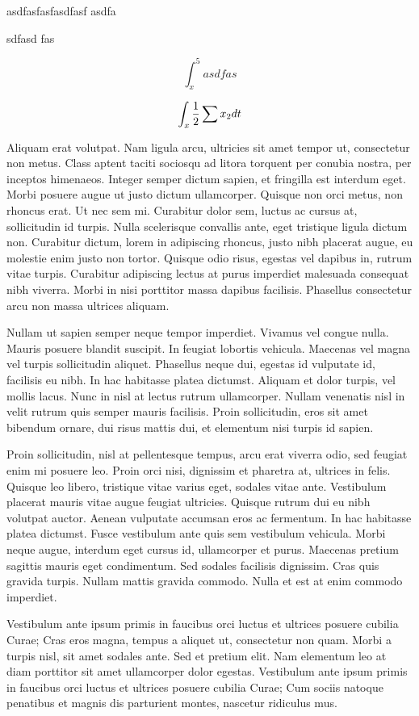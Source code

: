 asdfasfasfasdfasf asdfa

sdfasd fas

\[
\int_{x}^{5}asdfas
\]

\[
\int_{x}\frac{1}{2}\sum x_{2}dt
\]

Aliquam erat volutpat. Nam ligula arcu, ultricies sit amet tempor
ut, consectetur non metus. Class aptent taciti sociosqu ad litora
torquent per conubia nostra, per inceptos himenaeos. Integer semper
dictum sapien, et fringilla est interdum eget. Morbi posuere augue
ut justo dictum ullamcorper. Quisque non orci metus, non rhoncus erat.
Ut nec sem mi. Curabitur dolor sem, luctus ac cursus at, sollicitudin
id turpis. Nulla scelerisque convallis ante, eget tristique ligula
dictum non. Curabitur dictum, lorem in adipiscing rhoncus, justo nibh
placerat augue, eu molestie enim justo non tortor. Quisque odio risus,
egestas vel dapibus in, rutrum vitae turpis. Curabitur adipiscing
lectus at purus imperdiet malesuada consequat nibh viverra. Morbi
in nisi porttitor massa dapibus facilisis. Phasellus consectetur arcu
non massa ultrices aliquam.

Nullam ut sapien semper neque tempor imperdiet. Vivamus vel congue
nulla. Mauris posuere blandit suscipit. In feugiat lobortis vehicula.
Maecenas vel magna vel turpis sollicitudin aliquet. Phasellus neque
dui, egestas id vulputate id, facilisis eu nibh. In hac habitasse
platea dictumst. Aliquam et dolor turpis, vel mollis lacus. Nunc in
nisl at lectus rutrum ullamcorper. Nullam venenatis nisl in velit
rutrum quis semper mauris facilisis. Proin sollicitudin, eros sit
amet bibendum ornare, dui risus mattis dui, et elementum nisi turpis
id sapien.

Proin sollicitudin, nisl at pellentesque tempus, arcu erat viverra
odio, sed feugiat enim mi posuere leo. Proin orci nisi, dignissim
et pharetra at, ultrices in felis. Quisque leo libero, tristique vitae
varius eget, sodales vitae ante. Vestibulum placerat mauris vitae
augue feugiat ultricies. Quisque rutrum dui eu nibh volutpat auctor.
Aenean vulputate accumsan eros ac fermentum. In hac habitasse platea
dictumst. Fusce vestibulum ante quis sem vestibulum vehicula. Morbi
neque augue, interdum eget cursus id, ullamcorper et purus. Maecenas
pretium sagittis mauris eget condimentum. Sed sodales facilisis dignissim.
Cras quis gravida turpis. Nullam mattis gravida commodo. Nulla et
est at enim commodo imperdiet.

Vestibulum ante ipsum primis in faucibus orci luctus et ultrices posuere
cubilia Curae; Cras eros magna, tempus a aliquet ut, consectetur non
quam. Morbi a turpis nisl, sit amet sodales ante. Sed et pretium elit.
Nam elementum leo at diam porttitor sit amet ullamcorper dolor egestas.
Vestibulum ante ipsum primis in faucibus orci luctus et ultrices posuere
cubilia Curae; Cum sociis natoque penatibus et magnis dis parturient
montes, nascetur ridiculus mus.

